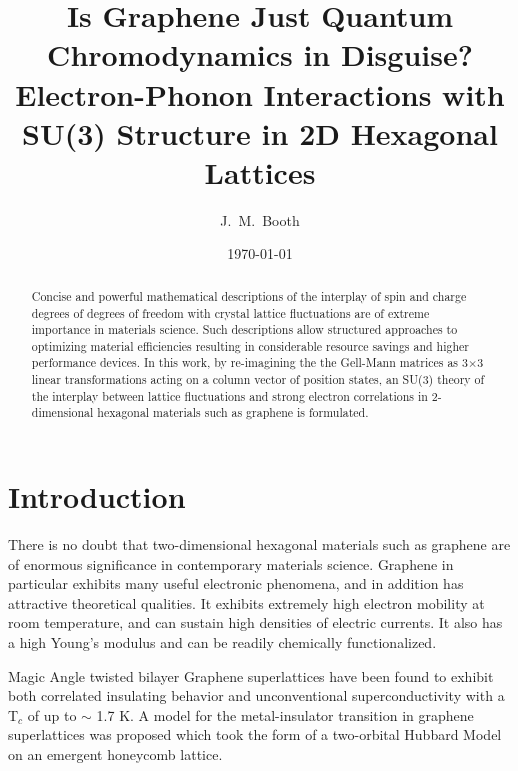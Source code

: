 \documentclass[prb,showpacs,superscriptaddress,titlepage,amsmath,amssymb,twocolumn]{revtex4-1}
\begin{document}
\title{
	Is Graphene Just Quantum Chromodynamics in Disguise? Electron-Phonon Interactions with SU(3) Structure in 2D Hexagonal Lattices
}
\author{J.~M.~Booth}


\date{\today}

\begin{abstract}
Concise and powerful mathematical descriptions of the interplay of spin and charge degrees of degrees of freedom with crystal lattice fluctuations are of extreme importance in materials science. Such descriptions allow structured approaches to optimizing material efficiencies resulting in considerable resource savings and higher performance devices. In this work, by re-imagining the the Gell-Mann matrices as 3$\times$3 linear transformations acting on a column vector of position states, an SU(3) theory of the interplay between lattice fluctuations and strong electron correlations in 2-dimensional hexagonal materials such as graphene is formulated. 
\end{abstract}

\maketitle
\section{Introduction}
There is no doubt that two-dimensional hexagonal materials such as graphene are of enormous significance in contemporary materials science. Graphene in particular exhibits many useful electronic phenomena, and in addition has attractive theoretical qualities. It exhibits extremely high electron mobility at room temperature, and can sustain high densities of electric currents\cite{Novoselov2012}. It also has a high Young's modulus and can be readily chemically functionalized\cite{Novoselov2012}.

Magic Angle twisted bilayer Graphene superlattices have been found to exhibit both correlated insulating behavior\cite{Cao2018_2} and unconventional superconductivity\cite{Cao2018} with a T$_{c}$ of up to $\sim$ 1.7 K. A model for the metal-insulator transition in graphene superlattices was proposed which took the form of a two-orbital Hubbard Model on an emergent honeycomb lattice\cite{Yuan2018}.
\end{document}
